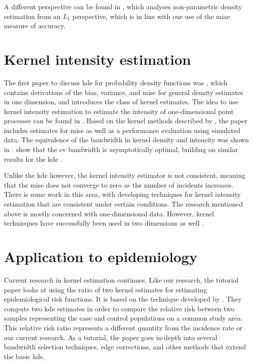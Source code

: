 A different perspective can be found in \citet{devroye1985nonparametric},
which analyses non-parametric density estimation from an $L_1$ perspective,
which is in line with our use of the \gls{miae} measure of accuracy.

\section{Kernel intensity estimation}

The first paper to discuss \gls{kde} for probability density functions was \citet{rosenblatt1956remarks},
which contains derivations of the bias, variance, and \acrfull{mise} for general density estimates in one dimension,
and introduces the class of kernel estimates.
The idea to use \gls{kernel intensity estimation} to estimate the intensity of one-dimensional point processes can be found in 
.
Based on the kernel methods described by \citet{rosenblatt1956remarks},
the paper includes estimates for \gls{mise} as well as a performance evaluation using simulated data.
The equivalence of the bandwidth in kernel density and intensity was shown in \citet{diggle1988equivalence}.
 show that the \gls{cv} bandwidth is asymptotically optimal,
building on similar results for the \gls{kde} \citep{hall1983large,burman1985data,stone1984asymptotically}.

Unlike the \gls{kde} however,
the \gls{kernel intensity estimator} is not consistent,
meaning that the \gls{mise} does not converge to zero as the number of incidents increases.
There is some work in this area,
with \citet{guan2008consistent,fuentes2016consistent} developing techniques for \gls{kernel intensity estimation} that are consistent under certain conditions.
The research mentioned above is mostly concerned with one-dimensional data.
However, kernel technieques have successfully been used in two dimensions as well \citep{scott1992multivariate}.

\section{Application to epidemiology}

Current research in kernel estimation continues.
Like our research, the tutorial paper \citet{davies2018tutorial} looks at using the ratio of two kernel estimates for estimating epidemiological risk functions.
It is based on the technique developed by \citet{bithell1990application,bithell1991estimation}.
They compute two \gls{kde} estimates in order to compare the relative risk between two samples representing the case and control populations on a common study area.
This relative risk ratio represents a different quantity from the incidence rate or our current research.
As a tutorial, the paper goes in-depth into several bandwidth selection techniques,
edge corrections, and other methods that extend the basic \gls{kde}.


